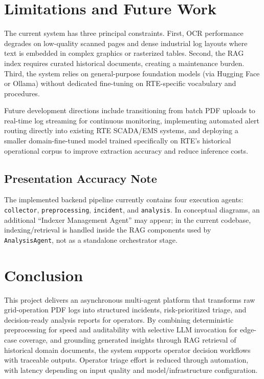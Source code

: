 \documentclass[11pt,a4paper]{article}
\begin{document}
\section{Limitations and Future Work}

The current system has three principal constraints. First, OCR performance degrades on low-quality scanned pages and dense industrial log layouts where text is embedded in complex graphics or rasterized tables. Second, the RAG index requires curated historical documents, creating a maintenance burden. Third, the system relies on general-purpose foundation models (via Hugging Face or Ollama) without dedicated fine-tuning on RTE-specific vocabulary and procedures.

Future development directions include transitioning from batch PDF uploads to real-time log streaming for continuous monitoring, implementing automated alert routing directly into existing RTE SCADA/EMS systems, and deploying a smaller domain-fine-tuned model trained specifically on RTE's historical operational corpus to improve extraction accuracy and reduce inference costs.

\subsection{Presentation Accuracy Note}

The implemented backend pipeline currently contains four execution agents: \texttt{collector}, \texttt{preprocessing}, \texttt{incident}, and \texttt{analysis}. In conceptual diagrams, an additional ``Indexer Management Agent'' may appear; in the current codebase, indexing/retrieval is handled inside the RAG components used by \texttt{AnalysisAgent}, not as a standalone orchestrator stage.

\section{Conclusion}

This project delivers an asynchronous multi-agent platform that transforms raw grid-operation PDF logs into structured incidents, risk-prioritized triage, and decision-ready analysis reports for operators. By combining deterministic preprocessing for speed and auditability with selective LLM invocation for edge-case coverage, and grounding generated insights through RAG retrieval of historical domain documents, the system supports operator decision workflows with traceable outputs. Operator triage effort is reduced through automation, with latency depending on input quality and model/infrastructure configuration.
\end{document}
